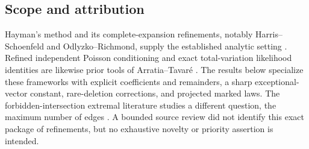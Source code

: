 \subsection{Scope and attribution}
Hayman's method and its complete-expansion refinements, notably Harris--Schoenfeld and Odlyzko--Richmond, supply the established analytic setting \cite{odlyzko}. Refined independent Poisson conditioning and exact total-variation likelihood identities are likewise prior tools of Arratia--Tavar\'e \cite{arratia}. The results below specialize these frameworks with explicit coefficients and remainders, a sharp exceptional-vector constant, rare-deletion corrections, and projected marked laws. The forbidden-intersection extremal literature studies a different question, the maximum number of edges \cite{keevash}. A bounded source review did not identify this exact package of refinements, but no exhaustive novelty or priority assertion is intended.

